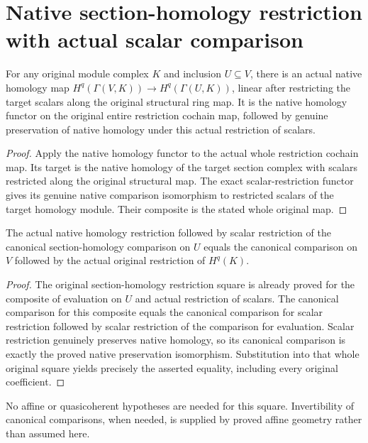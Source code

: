 \section{Native section-homology restriction with actual scalar comparison}
\label{sec:scheme-section-homology-restriction}

\begin{definition}
\label{def:scheme-original-native-section-homology-restriction}
\leanok
{}
For any original module complex $K$ and inclusion $U\subseteq V$,
there is an actual native homology map
$H^q(\Gamma(V,K))\to H^q(\Gamma(U,K))$, linear after restricting
the target scalars along the original structural ring map.
It is the native homology functor on the original entire
restriction cochain map, followed by genuine preservation
of native homology under this actual restriction of scalars.
\end{definition}
\begin{proof}
Apply the native homology functor to the actual whole
restriction cochain map. Its target is the native homology
of the target section complex with scalars restricted along
the original structural map. The exact scalar-restriction
functor gives its genuine native comparison isomorphism
to restricted scalars of the target homology module.
Their composite is the stated whole original map.
\end{proof}

\begin{proposition}
\label{prop:scheme-original-native-section-homology-restriction}
\leanok
{}
The actual native homology restriction followed by scalar
restriction of the canonical section-homology comparison on
$U$ equals the canonical comparison on $V$ followed by the
actual original restriction of $H^q(K)$.
\end{proposition}
\begin{proof}
The original section-homology restriction square is already
proved for the composite of evaluation on $U$ and actual
restriction of scalars. The canonical comparison for this
composite equals the canonical comparison for scalar
restriction followed by scalar restriction of the
comparison for evaluation. Scalar restriction genuinely
preserves native homology, so its canonical comparison is
exactly the proved native preservation isomorphism.
Substitution into that whole original square yields precisely
the asserted equality, including every original coefficient.
\end{proof}

No affine or quasicoherent hypotheses are needed for this
square. Invertibility of canonical comparisons, when needed,
is supplied by proved affine geometry rather than assumed here.
